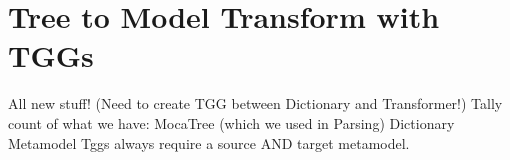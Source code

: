 \newpage
\section{Tree to Model Transform with TGGs}

All new stuff! (Need to create TGG between Dictionary and Transformer!)
Tally count of what we have:
	MocaTree (which we used in Parsing)
	Dictionary Metamodel
Tggs always require a source AND target metamodel.





